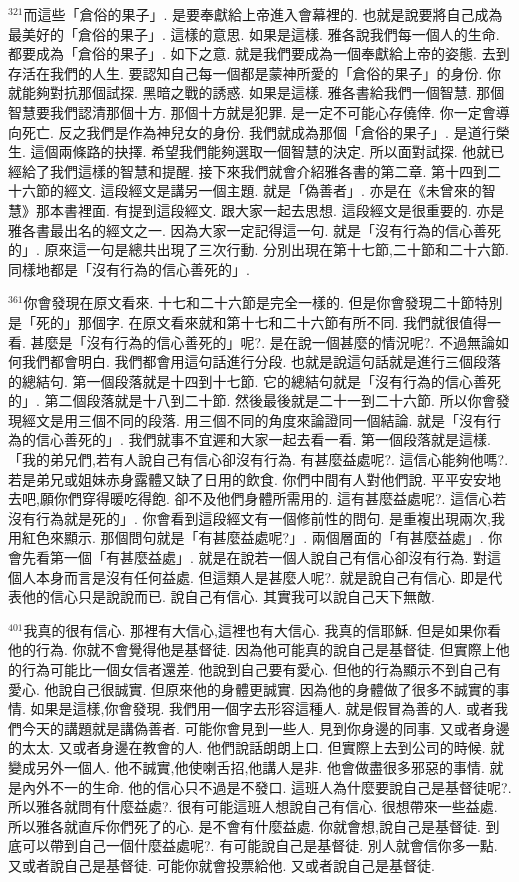 \documentclass{book}
\begin{document}
$^{321}$而這些「倉俗的果子」.
是要奉獻給上帝進入會幕裡的.
也就是說要將自己成為最美好的「倉俗的果子」.
這樣的意思.
如果是這樣.
雅各說我們每一個人的生命.
都要成為「倉俗的果子」.
如下之意.
就是我們要成為一個奉獻給上帝的姿態.
去到存活在我們的人生.
要認知自己每一個都是蒙神所愛的「倉俗的果子」的身份.
你就能夠對抗那個試探.
黑暗之戰的誘惑.
如果是這樣.
雅各書給我們一個智慧.
那個智慧要我們認清那個十方.
那個十方就是犯罪.
是一定不可能心存僥倖.
你一定會導向死亡.
反之我們是作為神兒女的身份.
我們就成為那個「倉俗的果子」.
是道行榮生.
這個兩條路的抉擇.
希望我們能夠選取一個智慧的決定.
所以面對試探.
他就已經給了我們這樣的智慧和提醒.
接下來我們就會介紹雅各書的第二章.
第十四到二十六節的經文.
這段經文是講另一個主題.
就是「偽善者」.
亦是在《未曾來的智慧》那本書裡面.
有提到這段經文.
跟大家一起去思想.
這段經文是很重要的.
亦是雅各書最出名的經文之一.
因為大家一定記得這一句.
就是「沒有行為的信心善死的」.
原來這一句是總共出現了三次行動.
分別出現在第十七節,二十節和二十六節.
同樣地都是「沒有行為的信心善死的」.

$^{361}$你會發現在原文看來.
十七和二十六節是完全一樣的.
但是你會發現二十節特別是「死的」那個字.
在原文看來就和第十七和二十六節有所不同.
我們就很值得一看.
甚麼是「沒有行為的信心善死的」呢?.
是在說一個甚麼的情況呢?.
不過無論如何我們都會明白.
我們都會用這句話進行分段.
也就是說這句話就是進行三個段落的總結句.
第一個段落就是十四到十七節.
它的總結句就是「沒有行為的信心善死的」.
第二個段落就是十八到二十節.
然後最後就是二十一到二十六節.
所以你會發現經文是用三個不同的段落.
用三個不同的角度來論證同一個結論.
就是「沒有行為的信心善死的」.
我們就事不宜遲和大家一起去看一看.
第一個段落就是這樣.
「我的弟兄們,若有人說自己有信心卻沒有行為.
有甚麼益處呢?.
這信心能夠他嗎?.
若是弟兄或姐妹赤身露體又缺了日用的飲食.
你們中間有人對他們說.
平平安安地去吧,願你們穿得暖吃得飽.
卻不及他們身體所需用的.
這有甚麼益處呢?.
這信心若沒有行為就是死的」.
你會看到這段經文有一個修前性的問句.
是重複出現兩次,我用紅色來顯示.
那個問句就是「有甚麼益處呢?」.
兩個層面的「有甚麼益處」.
你會先看第一個「有甚麼益處」.
就是在說若一個人說自己有信心卻沒有行為.
對這個人本身而言是沒有任何益處.
但這類人是甚麼人呢?.
就是說自己有信心.
即是代表他的信心只是說說而已.
說自己有信心.
其實我可以說自己天下無敵.

$^{401}$我真的很有信心.
那裡有大信心,這裡也有大信心.
我真的信耶穌.
但是如果你看他的行為.
你就不會覺得他是基督徒.
因為他可能真的說自己是基督徒.
但實際上他的行為可能比一個女信者還差.
他說到自己要有愛心.
但他的行為顯示不到自己有愛心.
他說自己很誠實.
但原來他的身體更誠實.
因為他的身體做了很多不誠實的事情.
如果是這樣,你會發現.
我們用一個字去形容這種人.
就是假冒為善的人.
或者我們今天的講題就是講偽善者.
可能你會見到一些人.
見到你身邊的同事.
又或者身邊的太太.
又或者身邊在教會的人.
他們說話朗朗上口.
但實際上去到公司的時候.
就變成另外一個人.
他不誠實,他使喇舌招,他講人是非.
他會做盡很多邪惡的事情.
就是內外不一的生命.
他的信心只不過是不發口.
這班人為什麼要說自己是基督徒呢?.
所以雅各就問有什麼益處?.
很有可能這班人想說自己有信心.
很想帶來一些益處.
所以雅各就直斥你們死了的心.
是不會有什麼益處.
你就會想,說自己是基督徒.
到底可以帶到自己一個什麼益處呢?.
有可能說自己是基督徒.
別人就會信你多一點.
又或者說自己是基督徒.
可能你就會投票給他.
又或者說自己是基督徒.
\end{document}
